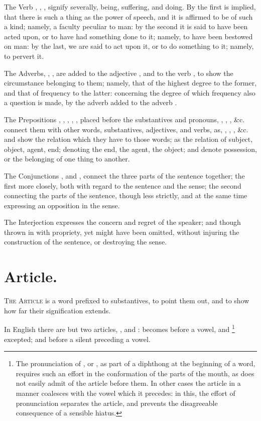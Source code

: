 The Verb , , , signify severally,
being, suffering, and doing. By the first is implied, that there is such
a thing as the power of speech, and it is affirmed to be of such a kind;
namely, a faculty peculiar to man: by the second it is said to have been
acted upon, or to have had something done to it; namely, to have been
bestowed on man: by the last, we are said to act upon it, or to do
something to it; namely, to pervert it.

The Adverbs, , , are added to the adjective
, and to the verb , to show the circumstance
belonging to them; namely, that of the highest degree to the former, and
that of frequency to the latter: concerning the degree of which
frequency also a question is made, by the adverb  added to the
adverb .

The Prepositions , , , , , placed
before the substantives and pronouns, , , ,
\&c. connect them with other words, substantives, adjectives, and verbs,
as, , , , \&c. and show the relation
which they have to those words; as the relation of subject, object,
agent, end;  denoting the end,  the agent,  the
object;  and  denote possession, or the belonging of one
thing to another.

The Conjunctions , and , connect the three parts of the
sentence together; the first more closely, both with regard to the
sentence and the sense; the second connecting the parts of the sentence,
though less strictly, and at the same time expressing an opposition in
the sense.

The Interjection  expresses the concern and regret of the
speaker; and though thrown in with propriety, yet might have been
omitted, without injuring the construction of the sentence, or
destroying the sense.

\section{Article.}

\textsc{The Article} is a word prefixed to substantives, to point them
out, and to show how far their signification extends.

In English there are but two articles, , and : 
becomes  before a vowel,  and \footnote{The
  pronunciation of , or , as part of a diphthong at the
  beginning of a word, requires such an effort in the conformation of
  the parts of the mouth, as does not easily admit of the article
   before them. In other cases the article  in a manner
  coalesces with the vowel which it precedes: in this, the effort of
  pronunciation separates the article, and prevents the disagreeable
  consequence of a sensible hiatus.} excepted; and before a silent
 preceding a vowel.

